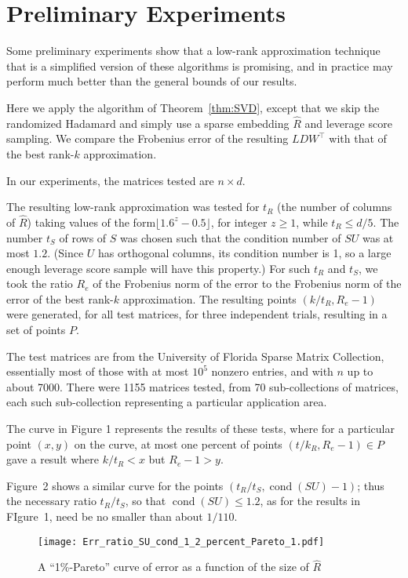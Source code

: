 \documentclass{sig-alternate}
\DeclareMathOperator{\cond}{\mathrm{cond}}
\begin{document}
\ifSTOC\else
\section{Preliminary Experiments}\label{sec:exper}

Some preliminary experiments show that a low-rank approximation technique that is a simplified
version of these algorithms is promising, and in practice may perform much better
than the general bounds of our results.

Here we apply the algorithm of Theorem~\ref{thm:SVD}, except that we skip the
randomized Hadamard and simply use a sparse embedding $\hat R$ 
and leverage score sampling. We compare the Frobenius error of the resulting $LDW^\top$
with that of the best rank-$k$ approximation.

In our experiments, the matrices tested
are $n\times d$.


The resulting low-rank approximation
was tested for $t_R$ (the number of columns of $\hat R$)
taking values of the form$\lfloor 1.6^z - 0.5\rfloor$, for integer
$z\ge 1$, while $t_R\le d/5$.
The number $t_S$ of rows of $S$ was chosen such that the condition number of $SU$ was at most $1.2$. (Since $U$ has orthogonal columns, its condition number is 1, so a large enough leverage
score sample will have this property.)
For such $t_R$ and $t_S$, we took the ratio $R_e$ of the Frobenius norm of the error to the Frobenius norm of the error of the
best rank-$k$ approximation. The resulting points $(k/t_R, R_e-1)$ were generated,
for all test matrices, for three independent trials, resulting in a set of points $P$.

The test matrices are from the University of Florida 
Sparse Matrix Collection,
essentially most of those with at most $10^5$ nonzero entries, and with $n$ up to about  7000.
There were 1155 matrices tested, from 70 sub-collections of matrices, each such
sub-collection representing a particular application area.

The curve in Figure 1 represents the results of these tests, where for a particular point
$(x,y)$ on the curve, at most one percent of points $(t/k_R, R_e-1)\in P$ gave a result where
$k/t_R < x$ but $R_e-1 > y$.

Figure~2 shows a similar curve for the points $(t_R/t_S, \cond(SU)-1)$; thus the necessary
ratio $t_R/t_S$, so that $\cond(SU)\le 1.2$, as for the results in FIgure~1, need be no smaller than
about $1/110$.



\begin{figure*}
\begin{center}
  \texttt{[image: Err\_ratio\_SU\_cond\_1\_2\_percent\_Pareto\_1.pdf]} 
 \end{center}
\caption{A ``1\%-Pareto'' curve of error as a function of the size of $\hat R$}
\end{figure*}
\end{document}
